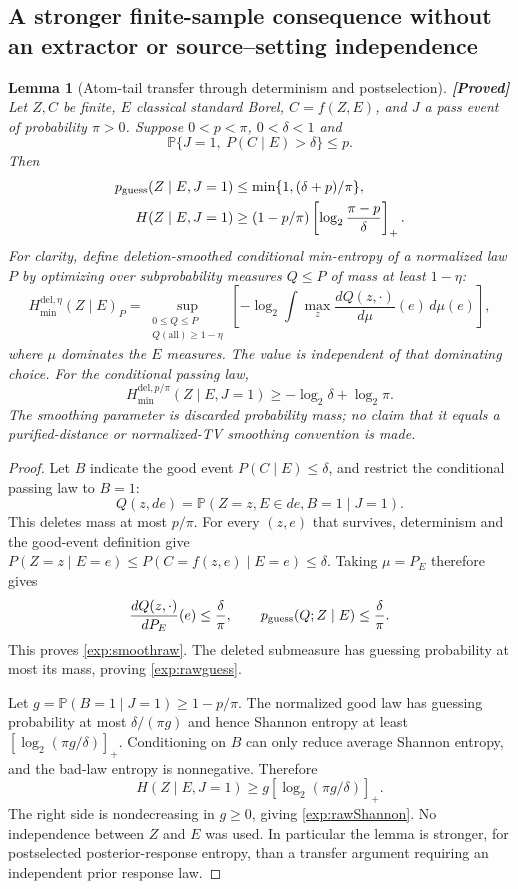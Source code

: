 \documentclass[11pt,a4paper]{article}
\newtheorem{lemma}[theorem]{Lemma}
\theoremstyle{definition}
\theoremstyle{remark}\newtheorem{remark}[theorem]{Remark}
\newcommand{\status}[1]{\textbf{[#1]}\quad}
\newcommand{\Prb}{\mathbb P}
\begin{document}
\subsection{A stronger finite-sample consequence without an extractor or source--setting independence}
\begin{lemma}[Atom-tail transfer through determinism and postselection]\label{exp:tailtransfer}
\status{Proved}
Let $Z,C$ be finite, $E$ classical standard Borel, $C=f(Z,E)$, and $J$ a pass event of probability $\pi>0$. Suppose $0<p<\pi$, $0<\delta<1$ and
\begin{equation}\label{exp:abstracttail}
 \Prb\{J=1,\ P(C\mid E)>\delta\}\le p.
\end{equation}
Then
\begin{align}
 p_{\rm guess}(Z\mid E,J=1)&\le\min\{1,(\delta+p)/\pi\},\label{exp:rawguess}\\
 H(Z\mid E,J=1)&\ge
 (1-p/\pi)\left[\log_2\frac{\pi-p}{\delta}\right]_+.
 \label{exp:rawShannon}
\end{align}
For clarity, define \emph{deletion-smoothed conditional min-entropy} of a normalized law $P$ by optimizing over subprobability measures $Q\le P$ of mass at least $1-\eta$:
\[
 H_{\min}^{\mathrm{del},\eta}(Z\mid E)_P
 =\sup_{\substack{0\le Q\le P\\Q(\mathrm{all})\ge1-\eta}}
 \left[-\log_2\int\max_z\frac{dQ(z,\cdot)}{d\mu}(e)\,d\mu(e)\right],
\]
where $\mu$ dominates the $E$ measures. The value is independent of that dominating choice. For the conditional passing law,
\begin{equation}\label{exp:smoothraw}
 H_{\min}^{\mathrm{del},p/\pi}(Z\mid E,J=1)
 \ge-\log_2\delta+\log_2\pi.
\end{equation}
The smoothing parameter is discarded probability mass; no claim that it equals a purified-distance or normalized-TV smoothing convention is made.
\end{lemma}
\begin{proof}
Let $B$ indicate the good event $P(C\mid E)\le\delta$, and restrict the conditional passing law to $B=1$:
\[
 Q(z,de)=\Prb(Z=z,E\in de,B=1\mid J=1).
\]
This deletes mass at most $p/\pi$. For every $(z,e)$ that survives, determinism and the good-event definition give
$P(Z=z\mid E=e)\le P(C=f(z,e)\mid E=e)\le\delta$.
Taking $\mu=P_E$ therefore gives
\[
 \frac{dQ(z,\cdot)}{dP_E}(e)\le\frac{\delta}{\pi},\qquad
 p_{\rm guess}(Q;Z\mid E)\le\frac{\delta}{\pi}.
\]
This proves \eqref{exp:smoothraw}. The deleted submeasure has guessing probability at most its mass, proving \eqref{exp:rawguess}.

Let $g=\Prb(B=1\mid J=1)\ge1-p/\pi$. The normalized good law has guessing probability at most $\delta/(\pi g)$ and hence Shannon entropy at least $[\log_2(\pi g/\delta)]_+$. Conditioning on $B$ can only reduce average Shannon entropy, and the bad-law entropy is nonnegative. Therefore
\[
 H(Z\mid E,J=1)\ge g[\log_2(\pi g/\delta)]_+.
\]
The right side is nondecreasing in $g\ge0$, giving \eqref{exp:rawShannon}. No independence between $Z$ and $E$ was used. In particular the lemma is stronger, for postselected posterior-response entropy, than a transfer argument requiring an independent prior response law.
\end{proof}
\end{document}
